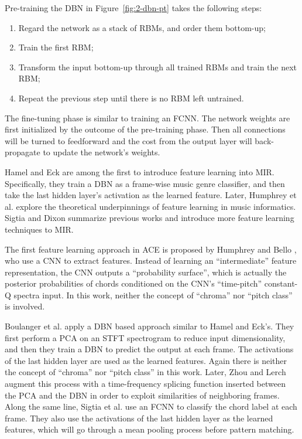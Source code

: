 \noindent
Pre-training the DBN in Figure~\ref{fig:2-dbn-pt} takes the following steps:
\begin{enumerate}
\item Regard the network as a stack of RBMs, and order them bottom-up;
\item Train the first RBM;
\item Transform the input bottom-up through all trained RBMs and train the next RBM;
\item Repeat the previous step until there is no RBM left untrained.
\end{enumerate}
The fine-tuning phase is similar to training an FCNN. The network weights are first initialized by the outcome of the pre-training phase. Then all connections will be turned to feedforward and the cost from the output layer will back-propagate to update the network's weights.

Hamel and Eck \cite{hamel2010learning} are among the first to introduce feature learning into MIR. Specifically, they train a DBN as a frame-wise music genre classifier, and then take the last hidden layer's activation as the learned feature. Later, Humphrey et al. \cite{humphrey2013feature} explore the theoretical underpinnings of feature learning in music informatics. Sigtia and Dixon \cite{sigtia2014improved} summarize previous works and introduce more feature learning techniques to MIR.

The first feature learning approach in ACE is proposed by Humphrey and Bello \cite{humphrey2012rethinking}, who use a CNN to extract features. Instead of learning an ``intermediate'' feature representation, the CNN outputs a ``probability surface'', which is actually the posterior probabilities of chords conditioned on the CNN's ``time-pitch'' constant-Q spectra input. In this work, neither the concept of ``chroma'' nor ``pitch class'' is involved. 

Boulanger et al. \cite{boulanger2013audio} apply a DBN based approach similar to Hamel and Eck's. They first perform a PCA on an STFT spectrogram to reduce input dimensionality, and then they train a DBN to predict the output at each frame. The activations of the last hidden layer are used as the learned features. Again there is neither the concept of ``chroma'' nor ``pitch class'' in this work. Later, Zhou and Lerch \cite{zhou2015chord} augment this process with a time-frequency splicing function inserted between the PCA and the DBN in order to exploit similarities of neighboring frames. Along the same line, Sigtia et al. \cite{sigtia2015audio} use an FCNN to classify the chord label at each frame. They also use the activations of the last hidden layer as the learned features, which will go through a mean pooling process before pattern matching.

